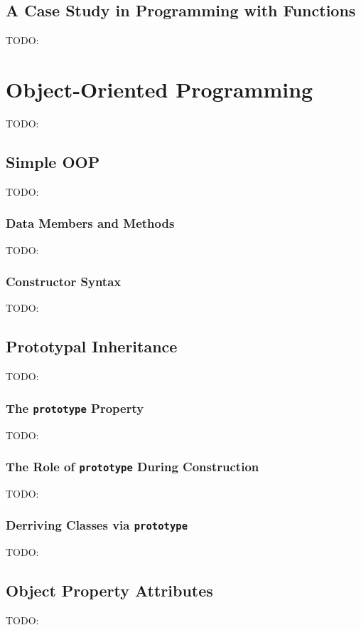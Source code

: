\documentclass[11pt,letter]{book}
\begin{document}
    \section{A Case Study in Programming with Functions}
    TODO:
    
    \chapter{Object-Oriented Programming}
    TODO:
    
    \section{Simple OOP}
    TODO:
    
    \subsection{Data Members and Methods}
    TODO:
    
    \subsection{Constructor Syntax}
    TODO:
    
    \section{Prototypal Inheritance}
    TODO:
    
    \subsection{The \texttt{prototype} Property}
    TODO:
    
    \subsection{The Role of \texttt{prototype} During Construction}
    TODO:
    
    \subsection{Derriving Classes via \texttt{prototype}}
    TODO:
    
    \section{Object Property Attributes}
    TODO:
    
\end{document}
